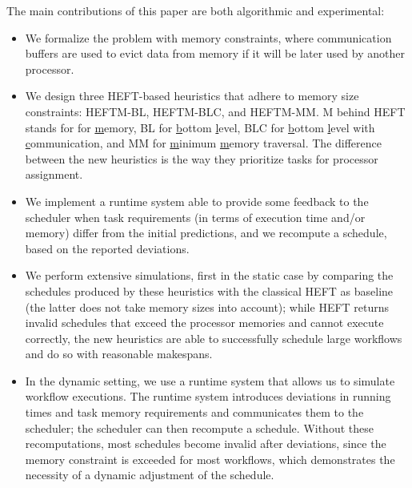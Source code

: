 \documentclass[conference]{IEEEtran}
\newcommand{\algo}[1]{\textsc{#1}}
\newcommand{\heftmm}{\algo{HEFTM-MM}\xspace}
\newcommand{\heftbl}{\algo{HEFTM-BL}\xspace}
\newcommand{\heftblc}{\algo{HEFTM-BLC}\xspace}
\newcommand{\new}[1]{{\color{blue}#1}}
\newcommand{\hmey}[1]{{\color{red}[HM: #1]}}
\begin{document}
The main contributions of this paper are both algorithmic and experimental:
\begin{itemize}
\item We formalize the problem with memory constraints, where communication buffers
are used to evict data from memory if it will be later used by another processor. 
\item We design three HEFT-based heuristics
that adhere to memory size constraints: \heftbl, \heftblc, and \heftmm.
M behind HEFT \new{stands for} for \underline{m}emory, BL for \underline{b}ottom \underline{l}evel,
BLC for \underline{b}ottom \underline{l}evel with \underline{c}ommunication, 
and MM for \underline{m}inimum \underline{m}emory traversal.
The difference between the new heuristics is the way they prioritize tasks for processor assignment.

\item We implement a runtime system able to provide some feedback to the scheduler
when task requirements (in terms of execution time and/or memory) differ from the initial predictions, 
and we recompute a schedule, based on the reported deviations. 

\item We perform extensive simulations, first in the static case by comparing the schedules produced 
by these heuristics with the classical HEFT as baseline (the latter does not take memory sizes into account); 
while HEFT returns invalid schedules that exceed the processor memories and cannot execute correctly,
the new heuristics are able to successfully schedule large workflows and do so with reasonable makespans.

\item In the dynamic setting, we use a runtime system that allows us to simulate workflow executions.
The runtime system introduces deviations in running times and task memory requirements and communicates
them to the scheduler; the scheduler can then recompute a schedule. Without these recomputations,
most schedules become invalid after deviations, since the memory constraint is exceeded 
for most workflows, which demonstrates the necessity of a dynamic adjustment of the schedule. 


\end{itemize}
\end{document}
